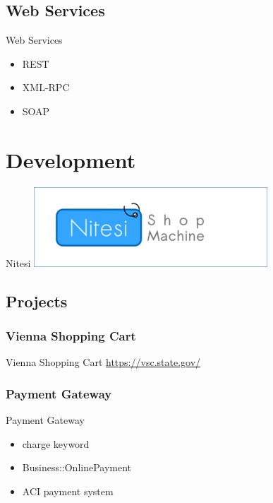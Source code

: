 \subsection{Web Services}
\begin{frame}{Web Services}
\begin{itemize}
\item REST
\item XML-RPC
\item SOAP
\end{itemize}
\end{frame}

\section{Development}

\begin{frame}{Nitesi}
  \includegraphics{nitesi.png}
\end{frame}

\subsection{Projects}
\subsubsection{Vienna Shopping Cart}
\begin{frame}{Vienna Shopping Cart}
\url{https://vsc.state.gov/}
\end{frame}

\subsubsection{Payment Gateway}
\begin{frame}{Payment Gateway}
  \begin{itemize}
  \item charge keyword
  \item Business::OnlinePayment
  \item ACI payment system
  \end{itemize}
\end{frame}

